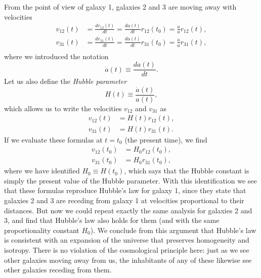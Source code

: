 From the point of view of galaxy 1, galaxies 2 and 3 are moving away with velocities
\begin{equation}
\begin{split}
v_{12}(t)&=\frac{dr_{12}(t)}{dt}=\frac{da(t)}{dt}r_{12}(t_0)=\frac{\dot{a}}{a}r_{12}(t),\\
v_{31}(t)&=\frac{dr_{31}(t)}{dt}=\frac{da(t)}{dt}r_{31}(t_0)=\frac{\dot{a}}{a}r_{31}(t),\\
\end{split}
\end{equation}
where we introduced the notation
\begin{equation}
\dot{a}(t)\equiv \frac{da(t)}{dt}.
\end{equation}
Let us also define the {\it Hubble parameter}
\begin{equation}
H(t)\equiv \frac{\dot{a}(t)}{a(t)},
\end{equation}
which allows us to write the velocities $v_{12}$ and $v_{31}$ as
\begin{equation}
\begin{split}
v_{12}(t)&=H(t)r_{12}(t),\\
v_{31}(t)&=H(t)r_{31}(t).
\end{split}
\end{equation}
If we evaluate these formulas at $t=t_0$ (the present time), we find
\begin{equation}
\begin{split}
v_{12}(t_0)&=H_0 r_{12}(t_0),\\
v_{31}(t_0)&=H_0 r_{31}(t_0),
\end{split}
\end{equation}
where we have identified $H_0\equiv H(t_0)$, which says that the Hubble constant is simply the present value of the Hubble parameter. With this identification we see that these formulas reproduce Hubble's law for galaxy 1, since they state that galaxies 2 and 3 are receding from galaxy 1 at velocities proportional to their distances. But now we could repeat exactly the same analysis for galaxies 2 and 3, and find that Hubble's law also holds for them (and with the same proportionality constant $H_0$). We conclude from this argument that Hubble's law is consistent with an expansion of the universe that preserves homogeneity and isotropy. There is no violation of the cosmological principle here: just as we see other galaxies moving away from us, the inhabitants of any of these likewise see other galaxies receding from them.


